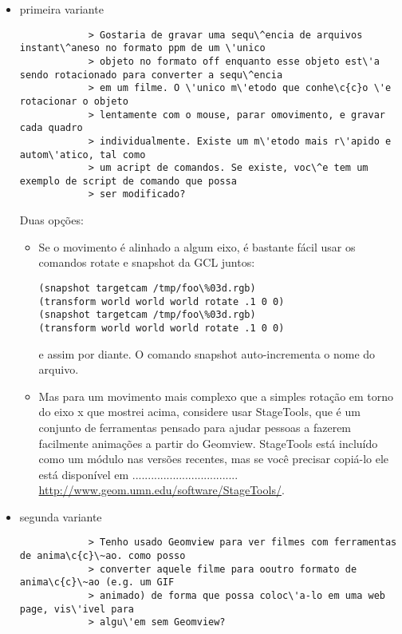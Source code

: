 \documentclass[12pt,a4paper]{article}
\begin{document}
        \begin{itemize}

        \item primeira variante \\
    	    \tiny
    	    \begin{verbatim}
            > Gostaria de gravar uma sequ\^encia de arquivos instant\^aneso no formato ppm de um \'unico
            > objeto no formato off enquanto esse objeto est\'a sendo rotacionado para converter a sequ\^encia
            > em um filme. O \'unico m\'etodo que conhe\c{c}o \'e rotacionar o objeto
            > lentamente com o mouse, parar omovimento, e gravar cada quadro
            > individualmente. Existe um m\'etodo mais r\'apido e autom\'atico, tal como
            > um acript de comandos. Se existe, voc\^e tem um exemplo de script de comando que possa
            > ser modificado?
	    \end{verbatim}
	    \normalsize
            Duas op\c{c}\~oes:
              \begin{itemize}
              \item Se o movimento \'e alinhado a algum eixo, \'e bastante f\'acil usar os
              comandos rotate e snapshot da GCL juntos:
\begin{verbatim}
(snapshot targetcam /tmp/foo\%03d.rgb)
(transform world world world rotate .1 0 0)
(snapshot targetcam /tmp/foo\%03d.rgb)
(transform world world world rotate .1 0 0)
\end{verbatim}
                e assim por diante. O comando snapshot auto-incrementa o nome do arquivo.

              \item Mas para um movimento mais complexo que a simples rota\c{c}\~ao em torno
                do eixo x que mostrei acima, considere usar StageTools, que
                \'e um conjunto de ferramentas pensado para ajudar pessoas a fazerem facilmente
                anima\c{c}\~oes a partir do Geomview. StageTools est\'a inclu\'ido como um m\'{o}dulo nas
                vers\~oes recentes, mas se voc\^e precisar copi\'a-lo ele est\'a dispon\'ivel
                em .................................. \url{http://www.geom.umn.edu/software/StageTools/}.
              \end{itemize}

        \item segunda variante \\
    	    \tiny
	    \begin{verbatim}
            > Tenho usado Geomview para ver filmes com ferramentas de anima\c{c}\~ao. como posso
            > converter aquele filme para ooutro formato de anima\c{c}\~ao (e.g. um GIF
            > animado) de forma que possa coloc\'a-lo em uma web page, vis\'ivel para
            > algu\'em sem Geomview?
	    \end{verbatim}
	    \normalsize
	    

\end{itemize}
\end{document}
